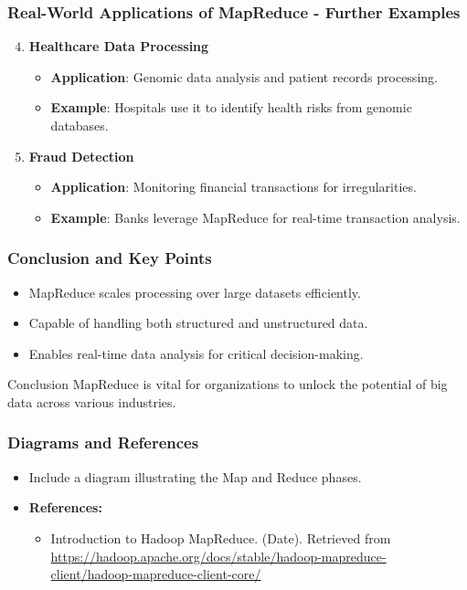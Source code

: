 \documentclass[aspectratio=169]{beamer}
\begin{document}
\begin{frame}[fragile]
    \frametitle{Real-World Applications of MapReduce - Further Examples}
    \begin{enumerate}
        \setcounter{enumi}{3} %
        
        \item \textbf{Healthcare Data Processing}
            \begin{itemize}
                \item \textbf{Application}: Genomic data analysis and patient records processing.
                \item \textbf{Example}: Hospitals use it to identify health risks from genomic databases.
            \end{itemize}
        
        \item \textbf{Fraud Detection}
            \begin{itemize}
                \item \textbf{Application}: Monitoring financial transactions for irregularities.
                \item \textbf{Example}: Banks leverage MapReduce for real-time transaction analysis.
            \end{itemize}
    \end{enumerate}
\end{frame}

\begin{frame}[fragile]
    \frametitle{Conclusion and Key Points}
    \begin{itemize}
        \item MapReduce scales processing over large datasets efficiently.
        \item Capable of handling both structured and unstructured data.
        \item Enables real-time data analysis for critical decision-making.
    \end{itemize}
    \begin{block}{Conclusion}
        MapReduce is vital for organizations to unlock the potential of big data across various industries.
    \end{block}
\end{frame}

\begin{frame}[fragile]
    \frametitle{Diagrams and References}
    \begin{itemize}
        \item Include a diagram illustrating the Map and Reduce phases.
        \item \textbf{References:}
            \begin{itemize}
                \item Introduction to Hadoop MapReduce. (Date). Retrieved from \url{https://hadoop.apache.org/docs/stable/hadoop-mapreduce-client/hadoop-mapreduce-client-core/}
            \end{itemize}
    \end{itemize}
\end{frame}
\end{document}
